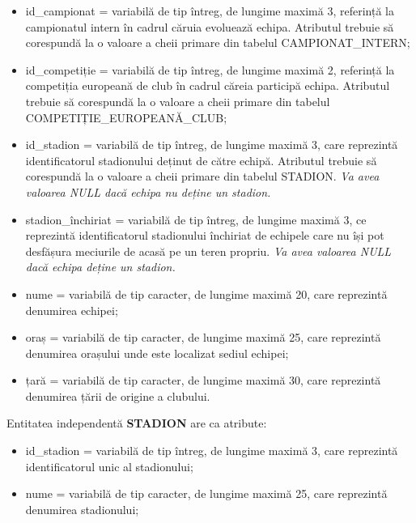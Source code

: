 \documentclass{article}
\begin{document}
\begin{spacing}{1.1}
\begin{itemize}
		\item id\_campionat = variabilă de tip întreg, de lungime maximă 3, referință la campionatul intern în cadrul căruia evoluează echipa. Atributul trebuie să corespundă la o valoare a cheii primare din tabelul CAMPIONAT\_INTERN;
		
		\item id\_competiție = variabilă de tip întreg, de lungime maximă 2, referință la competiția europeană de club în cadrul căreia participă echipa. Atributul trebuie să corespundă la o valoare a cheii primare din tabelul COMPETIȚIE\_EUROPEANĂ\_CLUB;
		
		\item id\_stadion = variabilă de tip întreg, de lungime maximă 3, care reprezintă identificatorul stadionului deținut de către echipă. Atributul trebuie să corespundă la o valoare a cheii primare din tabelul STADION. \textit{Va avea valoarea NULL dacă echipa nu deține un stadion.}
		
		\item stadion\_închiriat = variabilă de tip întreg, de lungime maximă 3, ce reprezintă identificatorul stadionului închiriat de echipele care nu își pot desfășura meciurile de acasă pe un teren propriu. \textit{Va avea valoarea NULL dacă echipa deține un stadion.}
		
		\item nume = variabilă de tip caracter, de lungime maximă 20, care reprezintă denumirea echipei;
		
		\item oraș = variabilă de tip caracter, de lungime maximă 25, care reprezintă denumirea orașului unde este localizat sediul echipei;
		
		\item țară = variabilă de tip caracter, de lungime maximă 30, care reprezintă denumirea țării de origine a clubului.
	\end{itemize}
	
	\vspace{0.3cm}
	
	Entitatea independentă \textbf{STADION} are ca atribute:
	
	\begin{itemize}
		\item id\_stadion = variabilă de tip întreg, de lungime maximă 3, care reprezintă identificatorul unic al stadionului;
		
		\item nume = variabilă de tip caracter, de lungime maximă 25, care reprezintă denumirea stadionului;
		

\end{itemize}
\end{spacing}
\end{document}
